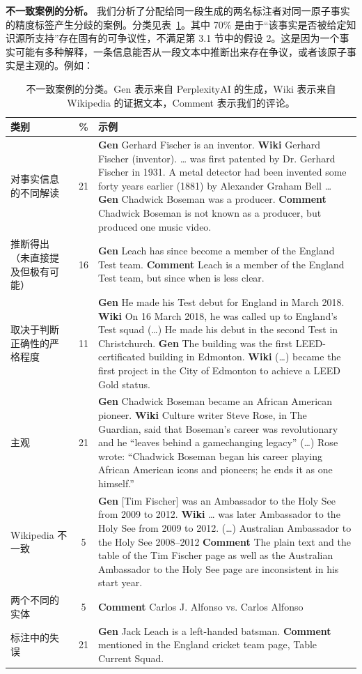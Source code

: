 \documentclass[11pt,UTF8,fontset=fandol]{ctexart}
\begin{document}
\textbf{不一致案例的分析。} 我们分析了分配给同一段生成的两名标注者对同一原子事实的精度标签产生分歧的案例。分类见表~\ref{tab:8}。其中 70\% 是由于“该事实是否被给定知识源所支持”存在固有的可争议性，不满足第 3.1 节中的假设 2。这是因为一个事实可能有多种解释，一条信息能否从一段文本中推断出来存在争议，或者该原子事实是主观的。例如：

\begin{table}[H]\centering
\caption{不一致案例的分类。Gen 表示来自 PerplexityAI 的生成，Wiki 表示来自 Wikipedia 的证据文本，Comment 表示我们的评论。}
\label{tab:8}
\small
\renewcommand{\arraystretch}{1.25}
\begin{tabular}{p{3.2cm}c p{10cm}}
\toprule
类别 & \% & 示例 \\
\midrule
对事实信息的不同解读 & 21 &
\textbf{Gen} Gerhard Fischer is an inventor. \textbf{Wiki} Gerhard Fischer (inventor). \ldots{} was first patented by Dr. Gerhard Fischer in 1931. A metal detector had been invented some forty years earlier (1881) by Alexander Graham Bell \ldots \newline
\textbf{Gen} Chadwick Boseman was a producer. \textbf{Comment} Chadwick Boseman is not known as a producer, but produced one music video. \\
推断得出（未直接提及但极有可能） & 16 &
\textbf{Gen} Leach has since become a member of the England Test team. \textbf{Comment} Leach is a member of the England Test team, but since when is less clear. \\
取决于判断正确性的严格程度 & 11 &
\textbf{Gen} He made his Test debut for England in March 2018. \textbf{Wiki} On 16 March 2018, he was called up to England's Test squad (\ldots) He made his debut in the second Test in Christchurch. \newline
\textbf{Gen} The building was the first LEED-certificated building in Edmonton. \textbf{Wiki} (\ldots) became the first project in the City of Edmonton to achieve a LEED Gold status. \\
主观 & 21 &
\textbf{Gen} Chadwick Boseman became an African American pioneer. \textbf{Wiki} Culture writer Steve Rose, in The Guardian, said that Boseman's career was revolutionary and he ``leaves behind a gamechanging legacy'' (\ldots) Rose wrote: ``Chadwick Boseman began his career playing African American icons and pioneers; he ends it as one himself.'' \\
Wikipedia 不一致 & 5 &
\textbf{Gen} [Tim Fischer] was an Ambassador to the Holy See from 2009 to 2012. \textbf{Wiki} \ldots{} was later Ambassador to the Holy See from 2009 to 2012. (\ldots) Australian Ambassador to the Holy See 2008--2012 \textbf{Comment} The plain text and the table of the Tim Fischer page as well as the Australian Ambassador to the Holy See page are inconsistent in his start year. \\
两个不同的实体 & 5 &
\textbf{Comment} Carlos J. Alfonso vs. Carlos Alfonso \\
标注中的失误 & 21 &
\textbf{Gen} Jack Leach is a left-handed batsman. \textbf{Comment} mentioned in the England cricket team page, Table Current Squad. \\
\bottomrule
\end{tabular}
\end{table}
\end{document}
